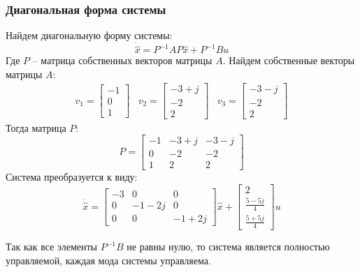 \subsubsection{Диагональная форма системы}
Найдем диагональную форму системы:
\begin{equation}
    \dot{\hat{x}} = P^{-1}AP\hat{x} + P^{-1}Bu
\end{equation}
Где $P$ -- матрица собственных векторов матрицы $A$. 
Найдем собственные векторы матрицы $A$:
\begin{equation}
    \begin{array}{ccc}
        v_1 = \begin{bmatrix} -1 \\ 0 \\ 1 \end{bmatrix} &
        v_2 = \begin{bmatrix} -3+j \\ -2 \\ 2 \end{bmatrix} &
        v_3 = \begin{bmatrix} -3-j \\ -2 \\ 2 \end{bmatrix} 
    \end{array}
\end{equation}
Тогда матрица $P$:
\begin{equation}
    P = \begin{bmatrix}
        -1 & -3+j & -3-j \\
        0 & -2 & -2 \\
        1 & 2 & 2
    \end{bmatrix}
\end{equation}
Система преобразуется к виду:
\begin{equation}
    \dot{\hat{x}} = \begin{bmatrix}
        -3 & 0 & 0 \\
        0 & -1-2j & 0 \\
        0 & 0 & -1+2j
    \end{bmatrix} \hat{x} + 
    \begin{bmatrix}
        2 \\
        \frac{5 - 5j}{4} \\ 
        \frac{5 + 5j}{4}
    \end{bmatrix} u
\end{equation}

Так как все элементы $P^{-1}B$ не равны нулю, то система является полностью управляемой, каждая мода системы управляема.

